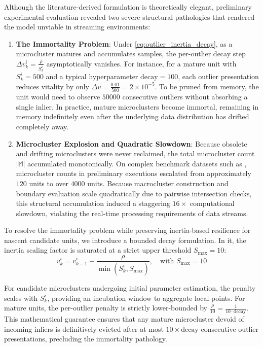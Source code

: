 Although the literature-derived  formulation is theoretically elegant, preliminary experimental evaluation revealed two severe structural pathologies that rendered the model unviable in streaming environments:

\begin{enumerate}
    \item \textbf{The Immortality Problem}: Under \cref{eq:outlier_inertia_decay}, as a microcluster matures and accumulates samples, the per-outlier decay step $\Delta v_k^i = \frac{\rho}{S_k^i}$ asymptotically vanishes. For instance, for a mature unit with $S_k^i = 500$ and a typical hyperparameter $\text{decay} = 100$, each outlier presentation reduces vitality by only $\Delta v = \frac{0.01}{500} = 2 \times 10^{-5}$. To be pruned from memory, the unit would need to observe $50000$ consecutive outliers without absorbing a single inlier. In practice, mature microclusters become immortal, remaining in memory indefinitely even after the underlying data distribution has drifted completely away.
    \item \textbf{Microcluster Explosion and Quadratic Slowdown}: Because obsolete and drifting microclusters were never reclaimed, the total microcluster count $|\mathbb{M}|$ accumulated monotonically. On complex benchmark datasets such as \ChameleonDSThree, microcluster counts in preliminary executions escalated from approximately $120$ units to over $4000$ units. Because macrocluster construction and boundary evaluation scale quadratically due to pairwise intersection checks, this structural accumulation induced a staggering $16\times$ computational slowdown, violating the real-time processing requirements of data streams.
\end{enumerate}

To resolve the immortality problem while preserving inertia-based resilience for nascent candidate units, we introduce a bounded decay formulation. In it, the inertia scaling factor is saturated at a strict upper threshold $S_{\max} = 10$:
\begin{equation}
    v_k^i = v_{k-1}^i - \frac{\rho}{\min(S_k^i, S_{\max})}, \quad \text{with } S_{\max} = 10
    \label{eq:bounded_inertia_decay}
\end{equation}

For candidate microclusters undergoing initial parameter estimation, the penalty scales with $S_k^i$, providing an incubation window to aggregate local points. For mature units, the per-outlier penalty is strictly lower-bounded by $\frac{\rho}{10} = \frac{1}{10 \cdot \text{decay}}$. This mathematical guarantee ensures that any mature microcluster devoid of incoming inliers is definitively evicted after at most $10 \times \text{decay}$ consecutive outlier presentations, precluding the immortality pathology.


